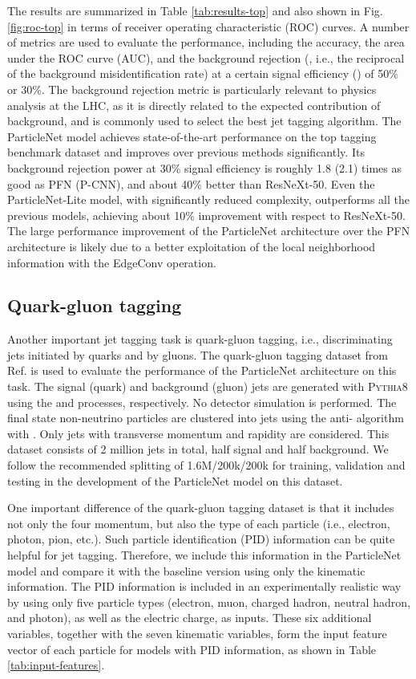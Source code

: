 \documentclass[aps,prd,longbibliography,reprint,amsmath,amssymb,amsfonts]{revtex4-1}
\begin{document}
The results are summarized in Table \ref{tab:results-top} and also shown in Fig. \ref{fig:roc-top} in terms of receiver operating characteristic (ROC) curves. A number of metrics are used to evaluate the performance, including the accuracy, the area under the ROC curve (AUC), and the background rejection (, i.e., the reciprocal of the background misidentification rate) at a certain signal efficiency () of 50\% or 30\%. The background rejection metric is particularly relevant to physics analysis at the LHC, as it is directly related to the expected contribution of background, and is commonly used to select the best jet tagging algorithm. The ParticleNet model achieves state-of-the-art performance on the top tagging benchmark dataset and improves over previous methods significantly. Its background rejection power at 30\% signal efficiency is roughly 1.8 (2.1) times as good as PFN (P-CNN), and about 40\% better than ResNeXt-50. Even the ParticleNet-Lite model, with significantly reduced complexity, outperforms all the previous models, achieving about 10\% improvement with respect to ResNeXt-50. The large performance improvement of the ParticleNet architecture over the PFN architecture is likely due to a better exploitation of the local neighborhood information with the EdgeConv operation.


\subsection{Quark-gluon tagging}
\label{sec:results-qg}

Another important jet tagging task is quark-gluon tagging, i.e., discriminating jets initiated by quarks and by gluons. The quark-gluon tagging dataset from Ref. \cite{Komiske:2018cqr} is used to evaluate the performance of the ParticleNet architecture on this task. The signal (quark) and background (gluon) jets are generated with \textsc{Pythia8} using the  and  processes, respectively. No detector simulation is performed. The final state non-neutrino particles are clustered into jets using the anti- algorithm \cite{Cacciari:2008gp} with . Only jets with transverse momentum  and rapidity  are considered. This dataset consists of 2 million jets in total, half signal and half background. We follow the recommended splitting of 1.6M/200k/200k for training, validation and testing in the development of the ParticleNet model on this dataset. 

One important difference of the quark-gluon tagging dataset is that it includes not only the four momentum, but also the type of each particle (i.e., electron, photon, pion, etc.). Such particle identification (PID) information can be quite helpful for jet tagging. Therefore, we include this information in the ParticleNet model and compare it with the baseline version using only the kinematic information. The PID information is included in an experimentally realistic way by using only five particle types (electron, muon, charged hadron, neutral hadron, and photon), as well as the electric charge, as inputs. These six additional variables, together with the seven kinematic variables, form the input feature vector of each particle for models with PID information, as shown in Table \ref{tab:input-features}.
\end{document}
